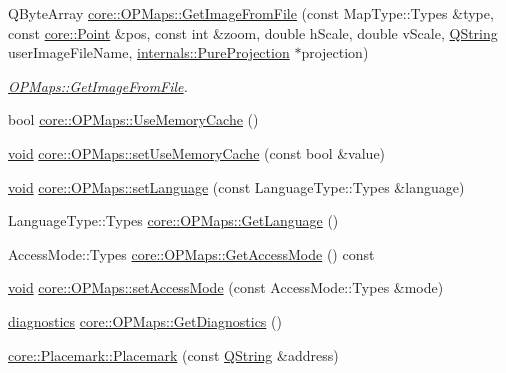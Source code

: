 \begin{DoxyCompactItemize}
\-Q\-Byte\-Array \hyperlink{group___o_p_map_widget_gae60565be4288e3fca3f28642b38d93ea}{core\-::\-O\-P\-Maps\-::\-Get\-Image\-From\-File} (const \-Map\-Type\-::\-Types \&type, const \hyperlink{structcore_1_1_point}{core\-::\-Point} \&pos, const int \&zoom, double h\-Scale, double v\-Scale, \hyperlink{group___u_a_v_objects_plugin_gab9d252f49c333c94a72f97ce3105a32d}{\-Q\-String} user\-Image\-File\-Name, \hyperlink{classinternals_1_1_pure_projection}{internals\-::\-Pure\-Projection} $\ast$projection)
\begin{DoxyCompactList}\small\item\em \hyperlink{group___o_p_map_widget_gae60565be4288e3fca3f28642b38d93ea}{\-O\-P\-Maps\-::\-Get\-Image\-From\-File}. \end{DoxyCompactList}\item 
bool \hyperlink{group___o_p_map_widget_ga2645fe8a750602f5aaa9258af2d7d63e}{core\-::\-O\-P\-Maps\-::\-Use\-Memory\-Cache} ()
\item 
\hyperlink{group___u_a_v_objects_plugin_ga444cf2ff3f0ecbe028adce838d373f5c}{void} \hyperlink{group___o_p_map_widget_ga87583d4fb36185a5b8275459e7703246}{core\-::\-O\-P\-Maps\-::set\-Use\-Memory\-Cache} (const bool \&value)
\item 
\hyperlink{group___u_a_v_objects_plugin_ga444cf2ff3f0ecbe028adce838d373f5c}{void} \hyperlink{group___o_p_map_widget_gae64b24b63987a957d4365fcca6bab5e5}{core\-::\-O\-P\-Maps\-::set\-Language} (const \-Language\-Type\-::\-Types \&language)
\item 
\-Language\-Type\-::\-Types \hyperlink{group___o_p_map_widget_gaef0dbfe6f1a4d195b33a070779dffc33}{core\-::\-O\-P\-Maps\-::\-Get\-Language} ()
\item 
\-Access\-Mode\-::\-Types \hyperlink{group___o_p_map_widget_ga9903355f0dd5ff46a913e1a02bb059ea}{core\-::\-O\-P\-Maps\-::\-Get\-Access\-Mode} () const 
\item 
\hyperlink{group___u_a_v_objects_plugin_ga444cf2ff3f0ecbe028adce838d373f5c}{void} \hyperlink{group___o_p_map_widget_ga68cf9ffb0f3ff2362243777dbd773437}{core\-::\-O\-P\-Maps\-::set\-Access\-Mode} (const \-Access\-Mode\-::\-Types \&mode)
\item 
\hyperlink{structdiagnostics}{diagnostics} \hyperlink{group___o_p_map_widget_ga4e9750aee8233e707a09efdb60f4c1af}{core\-::\-O\-P\-Maps\-::\-Get\-Diagnostics} ()
\item 
\hyperlink{group___o_p_map_widget_gab9298de24074616417ed9c9eee1e3fcc}{core\-::\-Placemark\-::\-Placemark} (const \hyperlink{group___u_a_v_objects_plugin_gab9d252f49c333c94a72f97ce3105a32d}{\-Q\-String} \&address)

\end{DoxyCompactItemize}
